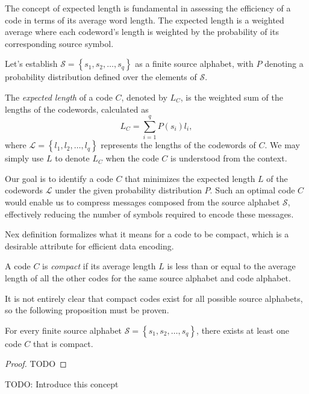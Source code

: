 The concept of expected length is fundamental in assessing the efficiency of a code in terms of its average word length. The expected length is a weighted average where each codeword's length is weighted by the probability of its corresponding source symbol.

Let's establish $\mathcal{S}=\left\{ s_{1},s_{2},\ldots,s_{q}\right\}$ as a finite source alphabet, with $P$ denoting a probability distribution defined over the elements of $\mathcal{S}$.

\begin{definition}
The \emph{expected length} of a code $C$, denoted by $L_{C}$, is the weighted sum of the lengths of the codewords, calculated as
\[
L_{C} = \sum_{i=1}^{q} P(s_{i})l_{i},
\]
where $\mathcal{L} = \left\{ l_{1},l_{2},\ldots,l_{q}\right\}$ represents the lengths of the codewords of $C$. We may simply use $L$ to denote $L_{C}$ when the code $C$ is understood from the context.
\end{definition}

Our goal is to identify a code $C$ that minimizes the expected length $L$ of the codewords $\mathcal{L}$ under the given probability distribution $P$. Such an optimal code $C$ would enable us to compress messages composed from the source alphabet $\mathcal{S}$, effectively reducing the number of symbols required to encode these messages.

Nex definition formalizes what it means for a code to be compact, which is a desirable attribute for efficient data encoding.

\begin{definition}
A code $C$ is \emph{compact} if its average length $L$ is less than or equal to the average length of all the other codes for the same source alphabet and code alphabet.
\end{definition}

It is not entirely clear that compact codes exist for all possible source alphabets, so the following proposition must be proven.

\begin{proposition}
For every finite source alphabet $\mathcal{S}=\left\{ s_{1},s_{2},\ldots,s_{q}\right\}$, there exists at least one code $C$ that is compact.
\end{proposition}
\begin{proof}
{\color{red} TODO}
\end{proof}

{\color{red} TODO: Introduce this concept}

